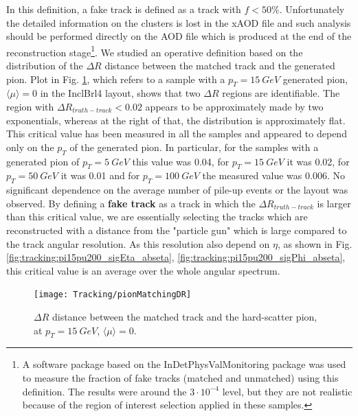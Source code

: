 \documentclass[a4paper,twoside,12pt]{book}
\begin{document}
In this definition, a fake track is defined as a track with $f < 50\%$. Unfortunately the detailed information on the clusters is lost in the xAOD file and such analysis should be performed directly on the AOD file
which is produced at the end of the reconstruction stage\footnote{A software package based on the InDetPhysValMonitoring package was used to measure the fraction of fake tracks (matched and unmatched) using this definition. The results were around the $3\cdot 10^{-4}$ level, but they are not realistic because of the region of interest selection applied in these samples.}. We studied an operative definition based on the distribution of the $\Delta R$ distance between the matched track and
the generated pion. Plot in Fig. \ref{fig:tracking:pionMatchingDR}, which refers to a sample with a $p_{T} = 15\ GeV$ generated pion, $\langle\mu\rangle = 0$ in the InclBrl4 layout, shows 
that two $\Delta R$ regions are identifiable. The region with $\Delta R_{truth-track} < 0.02$ appears to be approximately made by two exponentials, whereas at the right of that, the distribution is approximately flat. This critical value has been measured in all the samples and appeared to depend only on the $p_{T}$ of the generated pion. In particular, for the samples with a generated pion of $p_{T} = 5\ GeV$ this value was 0.04, for $p_{T} = 15\ GeV$ it was 0.02, for $p_{T} = 50\ GeV$ it was 0.01 and for $p_{T} = 100\ GeV$ the measured value was 0.006. No significant dependence on the average number of pile-up events or the layout was observed. By defining
a \textbf{fake track} as a track in which the $\Delta R_{truth-track}$ is larger than this critical value, we are essentially selecting the tracks
which are reconstructed with a distance from the "particle gun" which is large compared to the track angular resolution. As this resolution also depend on $\eta$, as shown in Fig.
\ref{fig:tracking:pi15pu200_sigEta_abseta}, \ref{fig:tracking:pi15pu200_sigPhi_abseta}, this critical value is an average over the whole angular spectrum.\\

\begin{figure}
\centering
\texttt{[image: Tracking/pionMatchingDR]}
\caption{$\Delta R$ distance between the matched track and the hard-scatter pion, at $p_{T} = 15\ GeV$, $\langle\mu\rangle = 0$.} 
\label{fig:tracking:pionMatchingDR}
\end{figure}
\end{document}
